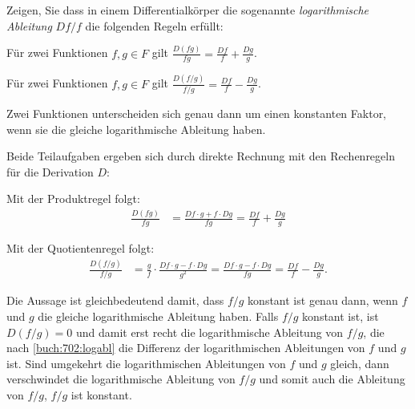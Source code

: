 Zeigen, Sie dass in einem Differentialkörper die sogenannte
\emph{logarithmische Ableitung}
%
$Df/f$ die folgenden Regeln erfüllt:
\begin{teilaufgaben}
\item
Für zwei Funktionen $f,g\in F$ gilt
$\displaystyle \frac{D(fg)}{fg}=\frac{Df}{f}+\frac{Dg}{g}$.
\item
Für zwei Funktionen $f,g\in F$ gilt
$\displaystyle \frac{D(f/g)}{f/g}=\frac{Df}{f}-\frac{Dg}{g}$.
\item
Zwei Funktionen unterscheiden sich genau dann um einen konstanten
Faktor, wenn sie die gleiche logarithmische Ableitung haben.
\end{teilaufgaben}

\begin{loesung}
Beide Teilaufgaben ergeben sich durch direkte Rechnung mit den
Rechenregeln für die Derivation $D$:
\begin{teilaufgaben}
\item Mit der Produktregel folgt:
\begin{align*}
\frac{D(fg)}{fg}
&=
\frac{Df\cdot g + f\cdot Dg}{fg}
=
\frac{Df}{f} + \frac{Dg}{g}
\end{align*}
\item Mit der Quotientenregel folgt:
\begin{align}
\frac{D(f/g)}{f/g}
&=
\frac{g}{f}\cdot \frac{Df\cdot g - f\cdot Dg}{g^2}
=
\frac{Df\cdot g - f\cdot Dg}{fg}
=
\frac{Df}{f} - \frac{Dg}{g}.
\label{buch:702:logabl}
\end{align}
\item
Die Aussage ist gleichbedeutend damit, dass $f/g$ konstant ist genau
dann, wenn $f$ und $g$ die gleiche logarithmische Ableitung haben.
Falls $f/g$ konstant ist, ist $D(f/g)=0$ und damit erst recht die
logarithmische Ableitung von $f/g$, die nach
\eqref{buch:702:logabl}
die Differenz der logarithmischen Ableitungen von $f$ und $g$ ist.
Sind umgekehrt die logarithmischen Ableitungen von $f$ und $g$ gleich,
dann verschwindet die logarithmische Ableitung von $f/g$ und somit auch
die Ableitung von $f/g$, $f/g$ ist konstant.
\qedhere
\end{teilaufgaben}
\end{loesung}
